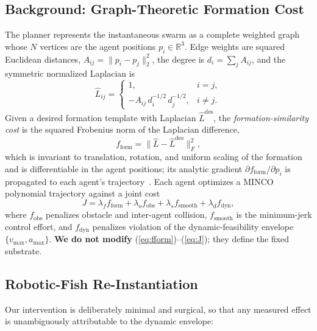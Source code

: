 \documentclass[journal]{IEEEtran}
\begin{document}
\subsection{Background: Graph-Theoretic Formation Cost}
The planner represents the instantaneous swarm as a complete weighted graph
whose $N$ vertices are the agent positions $p_i\in\mathbb{R}^3$. Edge weights
are squared Euclidean distances, $A_{ij}=\lVert p_i-p_j\rVert_2^2$, the degree
is $d_i=\sum_j A_{ij}$, and the symmetric normalized Laplacian is
\begin{equation}
\hat{L}_{ij}=
\begin{cases}
1, & i=j,\\[2pt]
-A_{ij}\,d_i^{-1/2}\,d_j^{-1/2}, & i\neq j .
\end{cases}
\end{equation}
Given a desired formation template with Laplacian $\hat{L}^{\mathrm{des}}$,
the \emph{formation-similarity cost} is the squared Frobenius norm of the
Laplacian difference,
\begin{equation}
f_{\mathrm{form}}=\big\lVert \hat{L}-\hat{L}^{\mathrm{des}}\big\rVert_F^2 ,
\label{eq:fform}
\end{equation}
which is invariant to translation, rotation, and uniform scaling of the
formation and is differentiable in the agent positions; its analytic gradient
$\partial f_{\mathrm{form}}/\partial p_i$ is propagated to each agent's
trajectory~\cite{quan2022distributed}. Each agent optimizes a
MINCO~\cite{wang2022geometrically} polynomial trajectory against a joint cost
\begin{equation}
J = \lambda_f f_{\mathrm{form}} + \lambda_o f_{\mathrm{obs}}
  + \lambda_s f_{\mathrm{smooth}} + \lambda_d f_{\mathrm{dyn}},
\label{eq:J}
\end{equation}
where $f_{\mathrm{obs}}$ penalizes obstacle and inter-agent collision,
$f_{\mathrm{smooth}}$ is the minimum-jerk control effort, and
$f_{\mathrm{dyn}}$ penalizes violation of the dynamic-feasibility envelope
$\{v_{\max},a_{\max}\}$. \textbf{We do not modify}
(\ref{eq:fform})--(\ref{eq:J}); they define the fixed substrate.

\subsection{Robotic-Fish Re-Instantiation}
Our intervention is deliberately minimal and surgical, so that any measured
effect is unambiguously attributable to the dynamic envelope:
\end{document}
